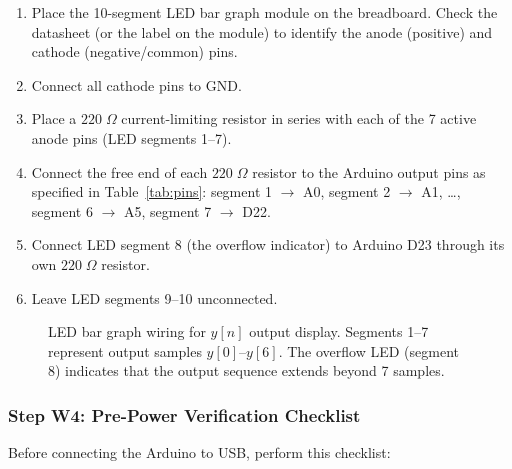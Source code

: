 \documentclass[11pt,letterpaper]{article}
\begin{document}
\begin{enumerate}
    \item Place the 10-segment LED bar graph module on the breadboard. Check the datasheet (or the label on the module) to identify the anode (positive) and cathode (negative/common) pins.
    \item Connect all cathode pins to GND.
    \item Place a $220\;\Omega$ current-limiting resistor in series with each of the 7 active anode pins (LED segments 1--7).
    \item Connect the free end of each $220\;\Omega$ resistor to the Arduino output pins as specified in Table~\ref{tab:pins}: segment 1 $\to$ A0, segment 2 $\to$ A1, \ldots, segment 6 $\to$ A5, segment 7 $\to$ D22.
    \item Connect LED segment 8 (the overflow indicator) to Arduino D23 through its own $220\;\Omega$ resistor.
    \item Leave LED segments 9--10 unconnected.
\end{enumerate}

\begin{figure}[H]
    \centering
    \vspace{0.3in}
    \vspace{0.1in}
    \caption{LED bar graph wiring for $y[n]$ output display. Segments 1--7 represent output samples $y[0]$--$y[6]$. The overflow LED (segment 8) indicates that the output sequence extends beyond 7 samples.}
    \label{fig:led_wiring}
\end{figure}

\subsubsection{Step W4: Pre-Power Verification Checklist}

Before connecting the Arduino to USB, perform this checklist:
\end{document}
